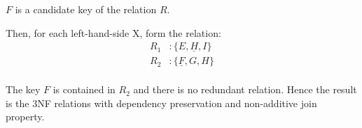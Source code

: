 \documentclass[12pt,letterpaper,titlepage,en-US]{article}
\begin{document}
\begin{homeworkProblem}
\begin{enumerate}[label=\textbf{Step {\arabic*}}, leftmargin=2cm]
            $F$ is a candidate key of the relation $R$.
    \end{enumerate}

Then, for each left-hand-side X, form the relation:
        \begin{align*}
            R_1& : \{E, \underline{H}, I\} \\
            R_2& : \{\underline{F}, G, H\} \\
        \end{align*}

The key $F$ is contained in $R_2$ and there is no redundant relation.
Hence the result is the 3NF relations with dependency preservation and non-additive join property.
\end{homeworkProblem}
\end{document}
